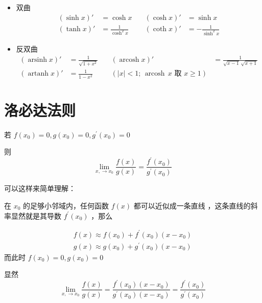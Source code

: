 \documentclass[lang=cn,newtx,10pt,scheme=chinese]{elegantbook}
\DeclareMathOperator{\arsinh}{arsinh}
\DeclareMathOperator{\arcosh}{arcosh}
\DeclareMathOperator{\artanh}{artanh}
\begin{document}
\begin{itemize}
  \item 双曲
  \begin{equation}
    \begin{aligned}
      (\sinh x)'&=\cosh x &\quad (\cosh x)'&=\sinh x \\
      (\tanh x)'&=\frac{1}{\cosh^{2} x} &\quad (\coth x)'&=-\frac{1}{\sinh^{2} x}
    \end{aligned}
  \end{equation}

  \item 反双曲
  \begin{equation}
    \begin{aligned}
      (\arsinh x)'&=\frac{1}{\sqrt{1+x^{2}}} &\quad (\arcosh x)'&=\frac{1}{\sqrt{x-1}\,\sqrt{x+1}} \\
      (\artanh x)'&=\frac{1}{1-x^{2}} &\quad (|x|<1;\,\arcosh\,x\text{ 取 }x\ge1)
    \end{aligned}
  \end{equation}
\end{itemize}


\section{洛必达法则}

若 $f(x_0)=0,g(x_0)= 0,g^{\prime }(x_0)=0$

则
\begin{equation}
  \lim_{x,\to x_0} \frac{f(x)}{g(x)}=\frac{f^{\prime }(x_0)}{g^{\prime }(x_0)}
\end{equation}

可以这样来简单理解：

在 $x_0$ 的足够小邻域内，任何函数 $f(x)$ 都可以近似成一条直线
，这条直线的斜率显然就是其导数 $f^{\prime }(x_0)$
，那么

\begin{equation}
  \begin{aligned}
  f(x)\approx f(x_0)+f^{\prime }(x_0)(x-x_0) \\
  g(x)\approx g(x_0)+g^{\prime }(x_0)(x-x_0)
  \end{aligned}
\end{equation}
而此时 $f(x_0)=0,g(x_0)=0$

显然 
\begin{equation}
  \lim_{x,\to x_0} \frac{f(x)}{g(x)}=\frac{f^{\prime }(x_0)(x-x_0)}{g^{\prime }(x_0)(x-x_0)}=\frac{f^{\prime }(x_0)}{g^{\prime }(x_0)}
\end{equation}
\end{document}
